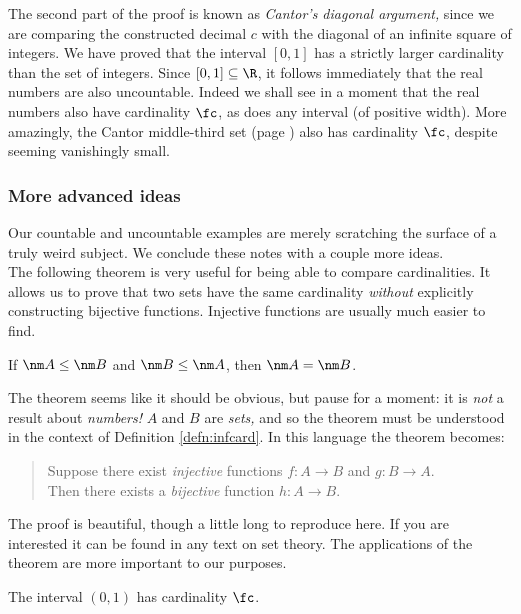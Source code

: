 \noindent The second part of the proof is known as \emph{Cantor's diagonal argument,} since we are comparing the constructed decimal $c$ with the diagonal of an infinite square of integers. We have proved that the interval $[0,1]$ has a strictly larger cardinality than the set of integers. Since $[0,1]\subseteq\R$, it follows immediately that the real numbers are also uncountable. Indeed we shall see in a moment that the real numbers also have cardinality $\fc$, as does any interval (of positive width). More amazingly, the Cantor middle-third set (page \pageref{ex:cantor}) also has cardinality $\fc$, despite seeming vanishingly small.

\subsubsection*{More advanced ideas}

Our countable and uncountable examples are merely scratching the surface of a truly weird subject. We conclude these notes with a couple more ideas.\\

The following theorem is very useful for being able to compare cardinalities. It allows us to prove that two sets have the same cardinality \emph{without} explicitly constructing bijective functions. Injective functions are usually much easier to find.

\begin{thm}
If $\nm A\le\nm B$ and $\nm B\le\nm A$, then $\nm A=\nm B$.
\end{thm}

\noindent The theorem seems like it should be obvious, but pause for a moment: it is \emph{not} a result about \emph{numbers!} $A$ and $B$ are \emph{sets,} and so the theorem must be understood in the context of Definition \ref{defn:infcard}. In this language the theorem becomes:
\begin{quote}
Suppose there exist \emph{injective} functions $f:A\to B$ and $g:B\to A$.\\
Then there exists a \emph{bijective} function $h:A\to B$.
\end{quote}
The proof is beautiful, though a little long to reproduce here. If you are interested it can be found in any text on set theory. The applications of the theorem are more important to our purposes.

\begin{thm}
The interval $(0,1)$ has cardinality $\fc$.
\end{thm}

